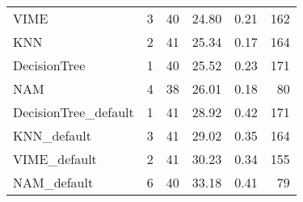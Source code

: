 \begin{tabular}{lrrrrr}
VIME                       &                  3 &  40 &  24.80 &                           0.21 &   162 \\
KNN                        &                  2 &  41 &  25.34 &                           0.17 &   164 \\
DecisionTree               &                  1 &  40 &  25.52 &                           0.23 &   171 \\
NAM                        &                  4 &  38 &  26.01 &                           0.18 &    80 \\
DecisionTree_default       &                  1 &  41 &  28.92 &                           0.42 &   171 \\
KNN_default                &                  3 &  41 &  29.02 &                           0.35 &   164 \\
VIME_default               &                  2 &  41 &  30.23 &                           0.34 &   155 \\
NAM_default                &                  6 &  40 &  33.18 &                           0.41 &    79 \\
\bottomrule
\end{tabular}

